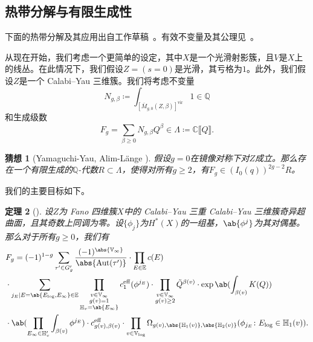 \documentclass{amsart}
\newtheorem{thm}{定理}[section]
\newtheorem{conj}[thm]{猜想}
\theoremstyle{definition}
\theoremstyle{remark}
\theoremstyle{plain}
\theoremstyle{definition}
\theoremstyle{remark}
\newcommand{\C}{\mathbb{C}}
\newcommand{\Q}{\mathbb{Q}}
\newcommand{\E}{\mathbb{E}}
\newcommand{\V}{\mathbb{V}}
\renewcommand{\H}{\mathbb{H}}
\newcommand{\mr}[1]{\mathrm{#1}}
\newcommand{\on}[1]{\operatorname{#1}}
\newcommand{\1}{\mathbf{1}}
\newcommand{\2}{\mathbf{2}}
\newcommand{\3}{\mathbf{3}}
\newcommand{\vir}{\mr{vir}}
\newcommand{\ps}[1]{\llbracket #1 \rrbracket}
\DeclareMathOperator{\Aut}{Aut}
\begin{document}
\subsection{热带分解与有限生成性}%
\label{sub:Tropical decomposition and finite generation}

下面的热带分解及其应用出自工作草稿~\cite{CJRtropical2025}。有效不变量及其公理见~\cite{CJRpunctured}。

从现在开始，我们考虑一个更简单的设定，其中\(X\)是一个光滑射影簇，且\(V\)是\(X\)上的线丛。在此情况下，我们假设\(Z = (s = 0)\)是光滑，其亏格为\(1\)。此外，我们假设\(Z\)是一个 Calabi--Yau 三维簇。我们将考虑不变量
\[ N_{g, \beta} \coloneqq \int_{[\bar{M}_{g,0}(Z, \beta)]^{\vir}} 1 \in \Q \]
和生成级数
\[ F_g = \sum_{\beta \geq 0} N_{g, \beta} Q^{\beta} \in \Lambda \coloneqq \C \ps{Q}. \]

\begin{conj}[Yamaguchi-Yau, Alim-L\"ange {\cite{YY2004,AlimLange2007}}]
    假设\(g=0\)在镜像对称下对\(Z\)成立。那么存在一个有限生成的\(\Q\)-代数\(R \subset \Lambda\)，使得对所有\(g \geq 2\)，有\(F_g \in (I_0(q))^{2g-2} R\)。
\end{conj}

我们的主要目标如下。

\begin{thm}[{\cite{CJRtropical2025}}]
    设\(Z\)为 Fano 四维簇\(X\)中的 Calabi--Yau 三重 Calabi--Yau 三维簇奇异超曲面，且其奇数上同调为零。设\(\{\phi_j\}\)为\(H^*(X)\)的一组基，\(\ab\{\phi^j\}\)为其对偶基。那么对于所有\(g \geq 0\)，我们有
    \begin{align*}
        &F_g = (-1)^{1-g} \sum_{\tau' \in G_g'} \frac{(-1)^{\abs{\V_{\infty}}}}{\abs{\Aut(\tau')}} \cdot \prod_{E \in \E} c(E) \\
        & \cdot \sum_{j_E \mid E = \ab\{E_{\log}, E_{\infty}\} \in \E} \prod_{\substack{v \in \V_{\infty} \\ g(v)=1 \\ \H_v = \ab\{E_{\infty}\}}} c_1^{\mr{eff}}(\phi^{j_E}) \cdot \prod_{\substack{v \in \V_{\infty} \\ g(v) \geq 2}} \tilde{Q}^{\beta(v)} \cdot \exp \ab(\int_{\beta(v)} K(Q) )  \\
        & \cdot \ab(\prod_{E_{\infty} \in \H_v'}\int_{\beta(v)} \phi^{j_E}) \cdot c_{g(v), \beta(v)}^{\on{eff}} 
         \cdot \prod_{v \in \V_{\log}} \Omega_{g(v), \abs{\H_1(v)}, \abs{\H_2(v)}} (\phi_{j_E} \colon E_{\log} \in \H_1(v)).
    \end{align*}
\end{thm}
\end{document}
